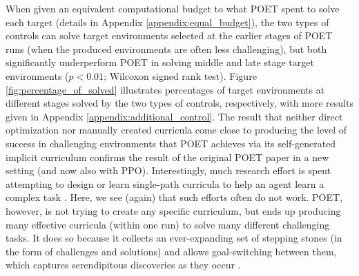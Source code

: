 \documentclass{article}
\newcommand{\ks}[1]{\comments{\textcolor{purple}{[Ken: #1]}}}
\newcommand{\rwang}[1]{\comments{\textcolor{blue}{[Rui: #1]}}}
\newcommand{\comments}[1]{#1} %
\begin{document}
When given an equivalent computational budget to what POET spent to solve each target (details in Appendix \ref{appendix:equal_budget}), the two types of controls can solve target environments selected at the earlier stages of POET runs (when the produced environments are often less challenging), but both significantly underperform POET in solving middle and late stage target environments ($p < 0.01$; Wilcoxon signed rank test). Figure \ref{fig:percentage_of_solved} illustrates percentages of target environments at different stages solved by the two types of controls, respectively,  with more results given in Appendix \ref{appendix:additional_control}.
The result that neither direct optimization nor manually created curricula come close to producing the level of success in challenging environments that POET achieves via its self-generated implicit curriculum confirms the result of the original POET paper in a new setting (and now also with PPO). Interestingly, much research effort is spent attempting to design or learn single-path curricula to help an agent learn a complex task \cite{gomez1997incremental,bengio2009curriculum,karpathy2012curriculum,heess2017emergence, justesen2017procedural}.
Here, we see (again) that such efforts often do not work. POET, however, is not trying to create any specific curriculum, but ends up producing many effective curricula (within one run) to solve many different challenging tasks. It does so because it collects an ever-expanding set of stepping stones (in the form of challenges and solutions) and allows goal-switching between them, which captures serendipitous discoveries as they occur \cite{stanley:book15,nguyen2016understanding,lehman:gecco11}. 
\end{document}
